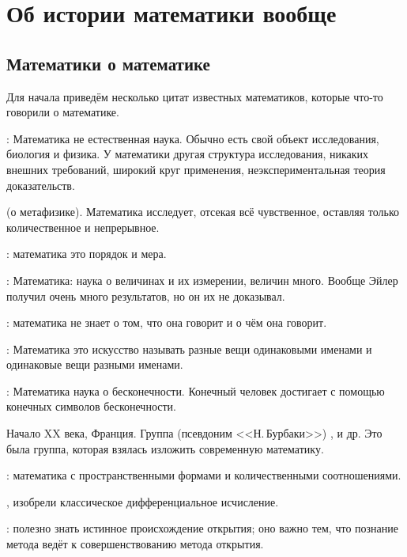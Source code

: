 \documentclass[a4paper,oneside,fleqn,10pt]{article}
\begin{document}
\tableofcontents


\section{Об истории математики вообще}

\subsection{Математики о математике}

Для начала приведём несколько цитат известных математиков, которые
что-то говорили о математике.

: Математика не естественная наука. Обычно есть свой
объект исследования, биология и физика. У математики другая структура
исследования, никаких внешних требований, широкий круг применения,
неэкспериментальная теория доказательств.

 (о метафизике). Математика исследует, отсекая всё
чувственное, оставляя только количественное и непрерывное.

: математика это порядок и мера.

: Математика: наука о величинах и их
измерении, величин много.  Вообще Эйлер получил очень много
результатов, но он их не доказывал.

: математика не знает о том, что она
говорит и о чём она говорит.

: Математика это искусство называть
разные вещи одинаковыми именами и одинаковые вещи разными именами.

: Математика наука о бесконечности. Конечный человек
достигает с помощью конечных символов бесконечности.

Начало XX века, Франция. Группа 
(псевдоним <<Н.\,Бурбаки>>) ,  и
др. Это была группа, которая взялась изложить современную математику.

: математика  с
пространственными формами и количественными соотношениями.

,  изобрели классическое
дифференциальное исчисление.

: полезно знать истинное происхождение открытия; оно
важно тем, что познание метода ведёт к совершенствованию метода
открытия.
\end{document}
